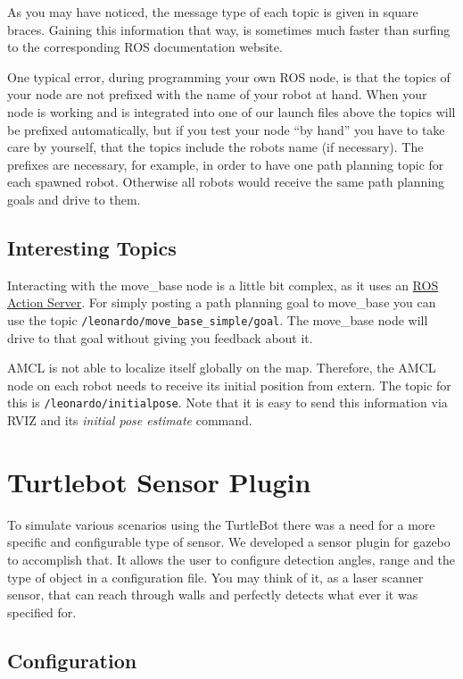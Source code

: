 As you may have noticed, the message type of each topic is given in square braces. Gaining this information that way, is sometimes much faster than surfing to the corresponding ROS documentation website.

One typical error, during programming your own ROS node, is that the topics of your node are not prefixed with the name of your robot at hand. When your node is working and is integrated into one of our launch files above the topics will be prefixed automatically, but if you test your node ``by hand'' you have to take care by yourself, that the topics include the robots name (if necessary). The prefixes are necessary, for example, in order to have one path planning topic for each spawned robot. Otherwise all robots would receive the same path planning goals and drive to them. 

\subsection{Interesting Topics}
\label{ssec:InterestingTopics}

Interacting with the move\_base node is a little bit complex, as it uses an \href{http://wiki.ros.org/actionlib/Tutorials}{ROS Action Server}. For simply posting a path planning goal to move\_base you can use the topic \verb$/leonardo/move_base_simple/goal$. The move\_base node will drive to that goal without giving you feedback about it. 

AMCL is not able to localize itself globally on the map. Therefore, the AMCL node on each robot needs to receive its initial position from extern. The topic for this is \verb$/leonardo/initialpose$. Note that it is easy to send this information via RVIZ and its \emph{initial pose estimate} command.

\section{Turtlebot Sensor Plugin}

To simulate various scenarios using the TurtleBot there was a need for a more specific and configurable type of sensor. We developed a sensor plugin for gazebo to accomplish that. It allows the user to configure detection angles, range and the type of object in a configuration file. You may think of it, as a laser scanner sensor, that can reach through walls and perfectly detects what ever it was specified for.

\subsection{Configuration}

